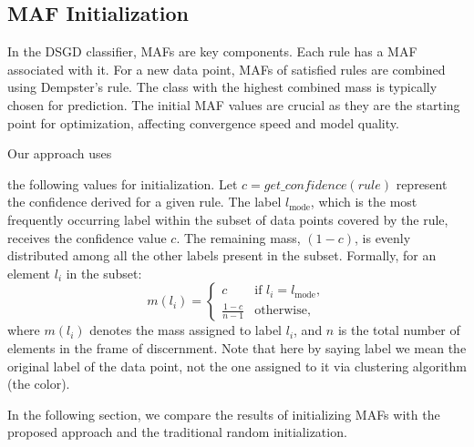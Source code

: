 \documentclass[10pt,a4paper,oneside]{article}
\begin{document}
\subsection{MAF Initialization}\label{2.4}
{\color{red}In the DSGD classifier, MAFs are key components. Each rule has a MAF associated with it. For a new data point, MAFs of satisfied rules are combined using Dempster's rule. The class with the highest combined mass is typically chosen for prediction. The initial MAF values are crucial as they are the starting point for optimization, affecting convergence speed and model quality.

Our approach uses} the following values for initialization. Let $c = get\_confidence(rule)$ represent the confidence derived for a given rule. The label $l_{\text{mode}}$, which is the most frequently occurring label within the subset of data points covered by the rule, receives the confidence value $c$. The remaining mass, $(1 - c)$, is evenly distributed among all the other labels present in the subset. Formally, for an element $l_i$ in the subset:
\[
m(l_i) = 
\begin{cases} 
c & \text{if } l_i = l_{\text{mode}}, \\
\frac{1-c}{n-1} & \text{otherwise},
\end{cases}
\]
where $m(l_i)$ denotes the mass assigned to label $l_i$, and $n$ is the total number of elements in the frame of discernment. Note that here by saying label we mean the original label of the data point, not the one assigned to it via clustering algorithm (the color). 

{\color{red}In the following section, we compare the results of initializing MAFs with the proposed approach and the traditional random initialization.}
\end{document}
